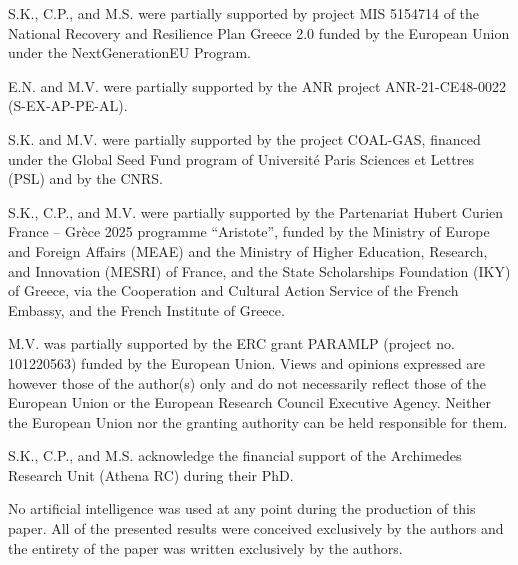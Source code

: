 S.K., C.P., and M.S. were partially supported by project MIS 5154714 of the National Recovery and Resilience Plan Greece 2.0 funded by the European Union under the NextGenerationEU Program.


E.N. and M.V. were partially supported by the ANR project ANR-21-CE48-0022 (S-EX-AP-PE-AL).


S.K. and M.V. were partially supported by the project COAL-GAS,
financed under the Global Seed Fund program of Université Paris Sciences et Lettres (PSL) and by the CNRS.


S.K., C.P., and M.V. were partially supported by the Partenariat Hubert Curien France – Grèce 2025 programme ``Aristote'', funded by the Ministry of Europe and Foreign Affairs (MEAE) and the Ministry of Higher Education, Research, and Innovation (MESRI) of France, and the State Scholarships Foundation (IKY) of Greece, via the Cooperation and Cultural Action Service of the French Embassy, and the French Institute of Greece.

M.V. was partially supported by the ERC grant PARAMLP (project no. 101220563) funded by the European Union.
Views and opinions expressed are however those of the author(s) only and do not necessarily reflect those of the European Union or the European Research Council Executive Agency. Neither the European Union nor the granting authority can be held responsible for them.

S.K., C.P., and M.S. acknowledge the financial support of the Archimedes Research Unit (Athena RC) during their PhD.

No artificial intelligence was used at any point during the production of this paper. All of the presented results were conceived exclusively by the authors and the entirety of the paper was written exclusively by the authors.







